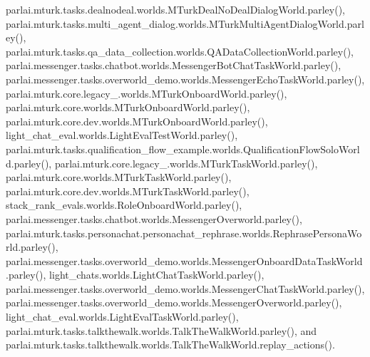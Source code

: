 parlai.\+mturk.\+tasks.\+dealnodeal.\+worlds.\+M\+Turk\+Deal\+No\+Deal\+Dialog\+World.\+parley(), parlai.\+mturk.\+tasks.\+multi\+\_\+agent\+\_\+dialog.\+worlds.\+M\+Turk\+Multi\+Agent\+Dialog\+World.\+parley(), parlai.\+mturk.\+tasks.\+qa\+\_\+data\+\_\+collection.\+worlds.\+Q\+A\+Data\+Collection\+World.\+parley(), parlai.\+messenger.\+tasks.\+chatbot.\+worlds.\+Messenger\+Bot\+Chat\+Task\+World.\+parley(), parlai.\+messenger.\+tasks.\+overworld\+\_\+demo.\+worlds.\+Messenger\+Echo\+Task\+World.\+parley(), parlai.\+mturk.\+core.\+legacy\+\_.\+worlds.\+M\+Turk\+Onboard\+World.\+parley(), parlai.\+mturk.\+core.\+worlds.\+M\+Turk\+Onboard\+World.\+parley(), parlai.\+mturk.\+core.\+dev.\+worlds.\+M\+Turk\+Onboard\+World.\+parley(), light\+\_\+chat\+\_\+eval.\+worlds.\+Light\+Eval\+Test\+World.\+parley(), parlai.\+mturk.\+tasks.\+qualification\+\_\+flow\+\_\+example.\+worlds.\+Qualification\+Flow\+Solo\+World.\+parley(), parlai.\+mturk.\+core.\+legacy\+\_.\+worlds.\+M\+Turk\+Task\+World.\+parley(), parlai.\+mturk.\+core.\+worlds.\+M\+Turk\+Task\+World.\+parley(), parlai.\+mturk.\+core.\+dev.\+worlds.\+M\+Turk\+Task\+World.\+parley(), stack\+\_\+rank\+\_\+evals.\+worlds.\+Role\+Onboard\+World.\+parley(), parlai.\+messenger.\+tasks.\+chatbot.\+worlds.\+Messenger\+Overworld.\+parley(), parlai.\+mturk.\+tasks.\+personachat.\+personachat\+\_\+rephrase.\+worlds.\+Rephrase\+Persona\+World.\+parley(), parlai.\+messenger.\+tasks.\+overworld\+\_\+demo.\+worlds.\+Messenger\+Onboard\+Data\+Task\+World.\+parley(), light\+\_\+chats.\+worlds.\+Light\+Chat\+Task\+World.\+parley(), parlai.\+messenger.\+tasks.\+overworld\+\_\+demo.\+worlds.\+Messenger\+Chat\+Task\+World.\+parley(), parlai.\+messenger.\+tasks.\+overworld\+\_\+demo.\+worlds.\+Messenger\+Overworld.\+parley(), light\+\_\+chat\+\_\+eval.\+worlds.\+Light\+Eval\+Task\+World.\+parley(), parlai.\+mturk.\+tasks.\+talkthewalk.\+worlds.\+Talk\+The\+Walk\+World.\+parley(), and parlai.\+mturk.\+tasks.\+talkthewalk.\+worlds.\+Talk\+The\+Walk\+World.\+replay\+\_\+actions().

\mbox{\label{classparlai_1_1messenger_1_1tasks_1_1chatbot_1_1worlds_1_1MessengerBotChatTaskWorld_a9987ef85470376e358479e6a44a62b49}} 
